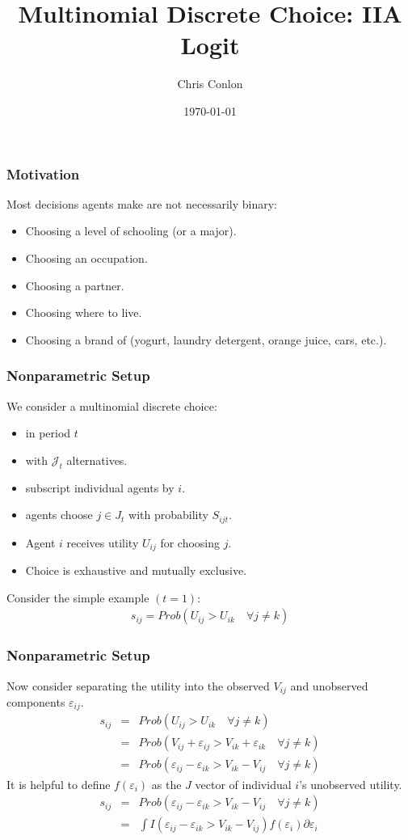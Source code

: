 \documentclass[xcolor=pdftex,dvipsnames,table,mathserif,aspectratio=169]{beamer}
\begin{document}
\title{Multinomial Discrete Choice: IIA Logit}
\author{Chris Conlon}
\date{\today}

\frame{\titlepage}


\begin{frame}
\frametitle{Motivation}
Most decisions agents make are not necessarily binary:
\begin{itemize}
\item Choosing a level of schooling (or a major).
\item Choosing an occupation.
\item Choosing a partner.
\item Choosing where to live.
\item Choosing a brand of (yogurt, laundry detergent, orange juice, cars, etc.).
 \end{itemize}
\end{frame}

\begin{frame}
\frametitle{Nonparametric Setup}
We consider a \alert{multinomial discrete choice}:
\begin{itemize}
\item in period $t$
\item with $\mathcal{J}_t$ alternatives.
\item subscript individual agents by $i$.
\item agents choose $j \in J_t$ with probability $S_{ijt}$.
\item Agent $i$ receives utility $U_{ij}$ for choosing $j$.
\item Choice is exhaustive and mutually exclusive.
 \end{itemize}\pause
Consider the simple example $(t=1)$:
\begin{eqnarray*}
s_{ij} = Prob( U_{ij} > U_{ik} \quad \forall j \neq k)
\end{eqnarray*}
\end{frame}

\begin{frame}
\frametitle{Nonparametric Setup}
Now consider separating the utility into the \alert{observed} $V_{ij}$ and \alert{unobserved} components $\varepsilon_{ij}$.
\begin{eqnarray*}
s_{ij} &=& Prob( U_{ij} > U_{ik} \quad \forall j \neq k)\\
 &=& Prob( V_{ij} + \varepsilon_{ij} > V_{ik} + \varepsilon_{ik} \quad \forall j \neq k)\\
 &=& Prob( \varepsilon_{ij}-\varepsilon_{ik} > V_{ik} - V_{ij} \quad \forall j \neq k)
\end{eqnarray*}
\pause
It is helpful to define $f(\varepsilon_{i})$ as the $J$ vector of individual $i$'s unobserved utility.
\begin{eqnarray*}
s_{ij} &=& Prob( \varepsilon_{ij}-\varepsilon_{ik} > V_{ik} - V_{ij} \quad \forall j \neq k)\\
&=& \int I( \varepsilon_{ij}-\varepsilon_{ik} > V_{ik} - V_{ij} ) f( \varepsilon_i) \partial \varepsilon_i \\
\end{eqnarray*}
\end{frame}
\end{document}
